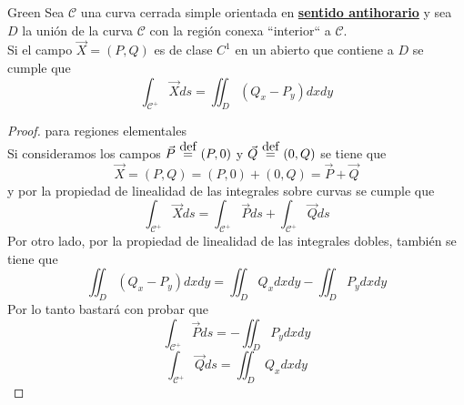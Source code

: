 \documentclass{report}
\newcommand\defeq{\stackrel{\mathclap{\normalfont\mbox{def}}}{~=~}}
\begin{document}
\begin{teobox}{Green}
	Sea $\mathcal{C}$ una curva cerrada simple orientada en \underline{\textbf{sentido antihorario}} y sea $D$ la unión de la curva $\mathcal{C}$ con la región conexa ``interior`` a $\mathcal{C}$. \\
	Si el campo $\vec{X} = (P,Q)$ es de clase $C^1$ en un abierto que contiene a $D$ se cumple que
	\begin{equation}
		\boxed{
			\int_{\mathcal{C}^+}{\vec{X}ds} = \iint_D{(Q_x - P_y)dxdy}
		}
		\label{eq:teo_green}
	\end{equation}
\end{teobox}
\begin{proof} para regiones elementales \\
Si consideramos los campos $\vec{P} \defeq (P,0)$ y $\vec{Q} \defeq (0,Q)$ se tiene que
\[
	\vec{X} = (P,Q) = (P,0) + (0,Q) = \vec{P} + \vec{Q}
\]
y por la propiedad de linealidad de las integrales sobre curvas se cumple que
\[
	\int_{\mathcal{C}^+}{\vec{X}ds} = \int_{\mathcal{C}^+}{\vec{P}ds} + \int_{\mathcal{C}^+}{\vec{Q}ds}
\]
Por otro lado, por la propiedad de linealidad de las integrales dobles, también se tiene que
\[
	\iint_D{(Q_x - P_y)dxdy} = \iint_D{Q_xdxdy} - \iint_D{P_ydxdy}
\]
Por lo tanto bastará con probar que
\[
	\int_{\mathcal{C}^+}{\vec{P}ds} = - \iint_D{P_ydxdy}
\]
\[
	\int_{\mathcal{C}^+}{\vec{Q}ds} = \iint_D{Q_xdxdy}
\]


\end{proof}
\end{document}
